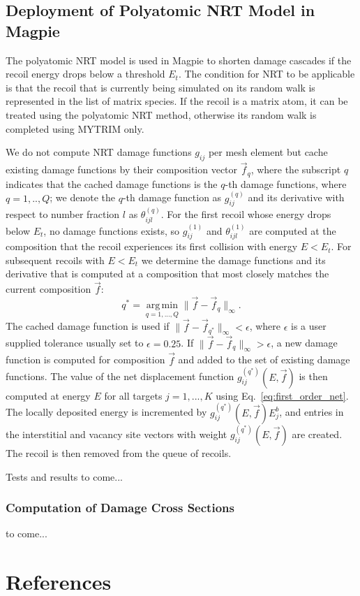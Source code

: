 \documentclass[review]{elsarticle}
\DeclareMathOperator*{\argmin}{arg\,min}
\begin{document}
\subsection{Deployment of Polyatomic NRT Model in Magpie}
The polyatomic NRT model is used in Magpie to shorten damage cascades if the recoil energy drops below a threshold $E_t$. The condition for NRT to be applicable is that the recoil that is currently being simulated on its random walk is 
represented in the list of matrix species. If the recoil is a matrix atom, it can be treated using the polyatomic NRT method, otherwise its random walk is completed using MYTRIM only. 

We do not compute NRT damage functions $g_{ij}$ per mesh element but cache existing damage functions by their composition vector $\vec{f}_q$, where the subscript $q$ indicates that the cached damage functions is the $q$-th damage functions, where $q=1,..,Q$; we denote the $q$-th damage function as $g^{(q)}_{ij}$ and its derivative with respect to number fraction $l$ as $\theta^{(q)}_{ijl}$. For the first recoil whose energy drops below $E_t$, no damage functions exists, so $g^{(1)}_{ij}$ and $\theta^{(1)}_{ijl}$ are computed at the composition that the recoil experiences its first collision with energy $E < E_t$. For subsequent recoils with $E<E_t$ we determine the damage functions and its derivative that is computed at a composition that most closely matches the current composition $\vec{f}$:
\begin{equation}
 q^* = \argmin\limits_{q=1,...,Q} \| \vec{f} -\vec{f}_q \|_{\infty}.
\end{equation}
The cached damage function is used if $ \| \vec{f} -\vec{f}_{q^*} \|_{\infty} < \epsilon$, where $\epsilon$ is a user supplied tolerance usually set to $\epsilon = 0.25$. 
If $ \| \vec{f} -\vec{f}_q \|_{\infty} > \epsilon$, a new damage function is computed for composition $\vec{f}$ and added to the set of existing damage functions. The value of the net displacement function $g_{ij}^{(q^*)}(E, \vec{f}) $ is then computed at energy $E$ for all targets $j=1,...,K$ using Eq.~\ref{eq:first_order_net}. The locally deposited energy is incremented by $g_{ij}^{(q^*)}(E, \vec{f}) E_j^b$, and entries in the interstitial and vacancy site vectors with weight $g_{ij}^{(q^*)}(E, \vec{f})$ are created. The recoil is then removed from the queue of recoils. 

Tests and results to come...

\subsubsection{Computation of Damage Cross Sections}
to come...

\clearpage
\section*{References}

\end{document}
